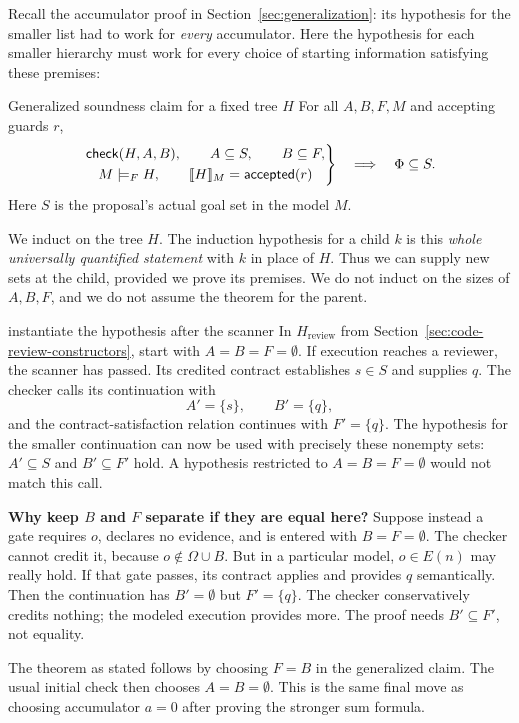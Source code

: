 Recall the accumulator proof in Section~\ref{sec:generalization}: its hypothesis for the smaller list had to work for \emph{every} accumulator. Here the hypothesis for each smaller hierarchy must work for every choice of starting information satisfying these premises:
\begin{statement}{Generalized soundness claim for a fixed tree $H$}
For all $A,B,F,M$ and accepting guards $r$,
\[
\left.
\begin{gathered}
\mathsf{check}(H,A,B),\qquad A\subseteq S,\qquad B\subseteq F,\\
M\models_F H,\qquad \llbracket H\rrbracket_{M}=\mathsf{accepted}(r)
\end{gathered}
\right\}
\quad\Longrightarrow\quad\Phi\subseteq S.
\]
Here $S$ is the proposal's actual goal set in the model $M$.
\end{statement}
We induct on the tree $H$. The induction hypothesis for a child $k$ is this \emph{whole universally quantified statement} with $k$ in place of $H$. Thus we can supply new sets at the child, provided we prove its premises. We do not induct on the sizes of $A,B,F$, and we do not assume the theorem for the parent.

\begin{example}{instantiate the hypothesis after the scanner}
In $H_{\mathrm{review}}$ from Section~\ref{sec:code-review-constructors}, start with $A=B=F=\emptyset$. If execution reaches a reviewer, the scanner has passed. Its credited contract establishes $s\in S$ and supplies $q$. The checker calls its continuation with
\[
A'=\{s\},\qquad B'=\{q\},
\]
and the contract-satisfaction relation continues with $F'=\{q\}$. The hypothesis for the smaller continuation can now be used with precisely these nonempty sets: $A'\subseteq S$ and $B'\subseteq F'$ hold. A hypothesis restricted to $A=B=F=\emptyset$ would not match this call.

\textbf{Why keep $B$ and $F$ separate if they are equal here?} Suppose instead a gate requires $o$, declares no evidence, and is entered with $B=F=\emptyset$. The checker cannot credit it, because $o\notin\Omega\cup B$. But in a particular model, $o\in E(n)$ may really hold. If that gate passes, its contract applies and provides $q$ semantically. Then the continuation has $B'=\emptyset$ but $F'=\{q\}$. The checker conservatively credits nothing; the modeled execution provides more. The proof needs $B'\subseteq F'$, not equality.
\end{example}

The theorem as stated follows by choosing $F=B$ in the generalized claim. The usual initial check then chooses $A=B=\emptyset$. This is the same final move as choosing accumulator $a=0$ after proving the stronger sum formula.

